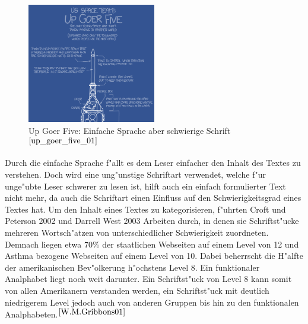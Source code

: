 \begin{figure}[h]
	\centering
		\includegraphics[width=0.50\textwidth]{Daten/up_goer_five_part.png}
	\caption{Up Goer Five: Einfache Sprache aber schwierige Schrift $^{\ref{up_goer_five_01}}$}
	\label{fig:GoerFive}
\end{figure}
 Durch die einfache Sprache f"allt es dem Leser einfacher den Inhalt des Textes zu verstehen. Doch wird eine ung"unstige Schriftart verwendet, welche f"ur unge"ubte Leser schwerer zu lesen ist, hilft auch ein einfach formulierter Text nicht mehr, da auch die Schriftart einen Einfluss auf den Schwierigkeitsgrad eines Textes hat.
Um den Inhalt eines Textes zu kategorisieren, f"uhrten Croft und Peterson 2002 und Darrell West 2003 Arbeiten durch, in denen sie Schriftst"ucke mehreren Wortsch"atzen von unterschiedlicher Schwierigkeit zuordneten.
Demnach liegen etwa 70\% der staatlichen Webseiten auf einem Level von 12 und Asthma bezogene Webseiten auf einem Level von 10.
Dabei beherrscht die H"alfte der amerikanischen Bev"olkerung h"ochstens Level 8. Ein funktionaler Analphabet liegt noch weit darunter.
Ein Schriftst"uck von Level 8 kann somit von allen Amerikanern verstanden werden, ein Schriftst"uck mit deutlich niedrigerem Level jedoch auch von anderen Gruppen bis hin zu den funktionalen Analphabeten.$^{\ref{W.M.Gribbons01}}$\\

